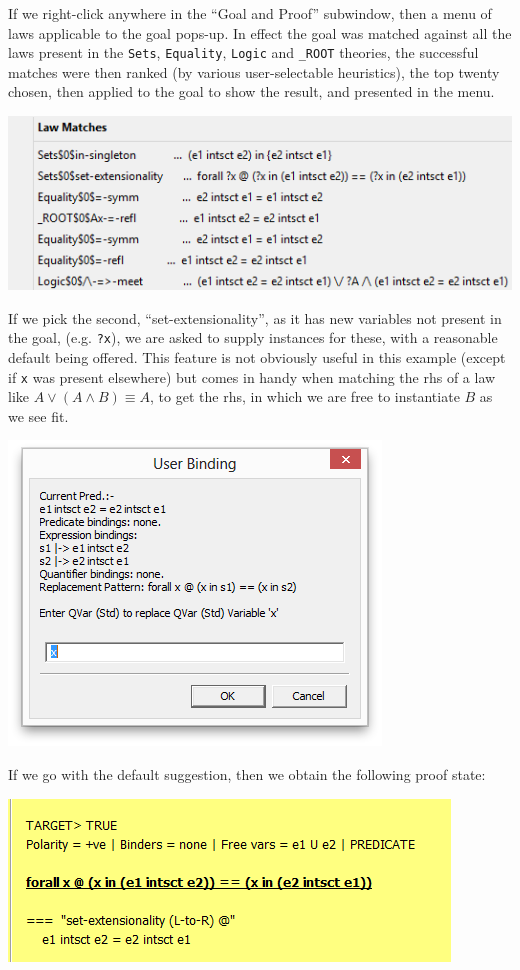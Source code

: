 \noindent
If we right-click anywhere in the ``Goal and Proof'' subwindow,
then a menu of laws applicable to the goal pops-up.
In effect the goal was matched against all the laws present in the
\texttt{Sets}, \texttt{Equality}, \texttt{Logic} and \texttt{\_ROOT} theories, the successful matches were then ranked
(by various user-selectable heuristics), the top twenty chosen, then applied to the
goal to show the result, and presented in the menu.

\includegraphics[scale=0.5]{07-laws-applicable-to-goal.png}

\noindent
If we pick the second, ``set-extensionality'', as it has new variables not present in the goal, (e.g. \texttt{?x}), we are asked to supply instances for these, with a reasonable default being offered.
This feature is not obviously useful in this example (except if \texttt{x} was present elsewhere) but comes in handy when matching the rhs of a law like $A \lor (A \land B) \equiv A$, to get the rhs,
in which we are free to instantiate $B$ as we see fit.

  \includegraphics[scale=0.5]{08-instantiating-qvars.png}

\noindent
If we go with the default suggestion, then we obtain the following proof state:

  \includegraphics[scale=0.5]{09-extensionality-applied.png}

